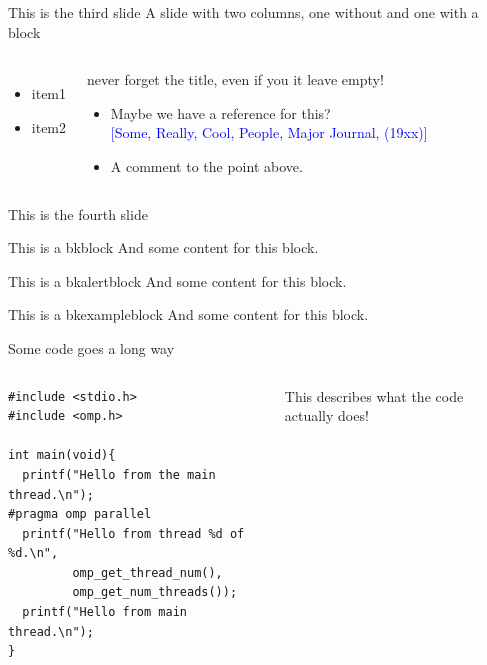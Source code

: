 \begin{frame}{This is the third slide}
A slide with two columns, one without and one with a block
\begin{columns}
    \begin{itemize}
      \item item1
      \item item2
    \end{itemize}
  \begin{block}{never forget the title, {\tiny even if you it leave empty!} }
    \begin{itemize}
      \item{Maybe we have a reference for this? \\ \hfill \textcolor{blue}{\footnotesize [Some, Really, Cool, People, Major Journal, (19xx)]}}
      \vspace{0.2cm}
      \item{A comment to the point above.}
    \end{itemize}
  \end{block}

\end{columns}
\end{frame}

\begin{frame}{This is the fourth slide}
  \begin{bkblock}{This is a bkblock}
    And some content for this block.
  \end{bkblock}
  \begin{bkalertblock}{This is a bkalertblock}
    And some content for this block.
  \end{bkalertblock}
  \begin{bkexampleblock}{This is a bkexampleblock}
    And some content for this block.
  \end{bkexampleblock}
\end{frame}

\begin{frame}[fragile]{Some code goes a long way}
  \begin{columns}
      \begin{verbatim}
#include <stdio.h>
#include <omp.h>

int main(void){
  printf("Hello from the main thread.\n");
#pragma omp parallel
  printf("Hello from thread %d of %d.\n",
         omp_get_thread_num(), 
         omp_get_num_threads());
  printf("Hello from main thread.\n");
}
      \end{verbatim}
      This describes what the code actually does!
  \end{columns}
\end{frame}


